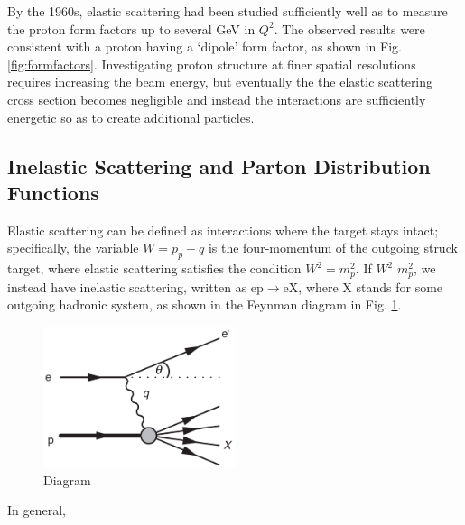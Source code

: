                 By the 1960s, elastic scattering had been studied sufficiently well as to measure the proton form factors up to several GeV in $Q^2$. The observed results were consistent with a proton having a `dipole' form factor, as shown in Fig. \ref{fig:formfactors}. Investigating proton structure at finer spatial resolutions requires increasing the beam energy, but eventually the the elastic scattering cross section becomes negligible and instead the interactions are sufficiently energetic so as to create additional particles.
                


    \subsection{Inelastic Scattering and Parton Distribution Functions}

        Elastic scattering can be defined as interactions where the target stays intact; specifically, the variable $W=p_p+q$ is the four-momentum of the outgoing struck target, where elastic scattering satisfies the condition $W^2 =m_p^2$. If $W^2$ \> $m_p^2$, we instead have inelastic scattering, written as ep$\rightarrow$eX, where X stands for some outgoing hadronic system, as shown in the Feynman diagram in Fig. \ref{fig:FeynmanInelastic}.    



    
        \begin{figure}\label{fig:FeynmanInelastic}
            \centering
            \includegraphics[width=0.5\textwidth]{Chapters/Ch1-Intro/Ch1-Sec1-Background/pics/inelastic-ep/eppx.png}
            \caption[Diagram]{Diagram}
        \end{figure}

        In general, 

